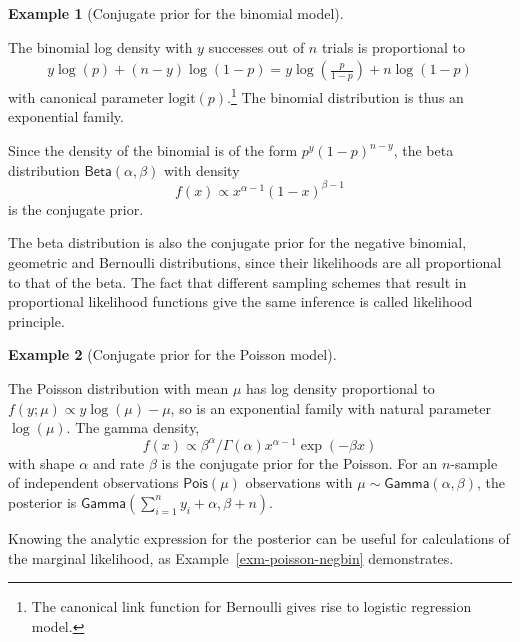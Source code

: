 \documentclass[
  11pt,
  letterpaper,
]{scrbook}
\theoremstyle{definition}
\newtheorem{example}{Example}[chapter]
\theoremstyle{definition}
\theoremstyle{definition}
\theoremstyle{plain}
\theoremstyle{remark}
\begin{document}
\begin{example}[Conjugate prior for the binomial
model]\protect\hypertarget{exm-conjugatepriors-binom}{}\label{exm-conjugatepriors-binom}

The binomial log density with \(y\) successes out of \(n\) trials is
proportional to \begin{align*}
y \log(p) + (n-y) \log(1-p) = y\log\left( \frac{p}{1-p}\right) + n \log(1-p)
\end{align*} with canonical parameter \(\mathrm{logit}(p)\).\footnote{The
  canonical link function for Bernoulli gives rise to logistic
  regression model.} The binomial distribution is thus an exponential
family.

Since the density of the binomial is of the form \(p^y(1-p)^{n-y}\), the
beta distribution \(\mathsf{Beta}(\alpha, \beta)\) with density
\[f(x) \propto x^{\alpha-1} (1-x)^{\beta-1}\] is the conjugate prior.

The beta distribution is also the conjugate prior for the negative
binomial, geometric and Bernoulli distributions, since their likelihoods
are all proportional to that of the beta. The fact that different
sampling schemes that result in proportional likelihood functions give
the same inference is called likelihood principle.

\end{example}

\begin{example}[Conjugate prior for the Poisson
model]\protect\hypertarget{exm-conjugatepriors-poisson}{}\label{exm-conjugatepriors-poisson}

The Poisson distribution with mean \(\mu\) has log density proportional
to \(f(y; \mu) \propto y\log(\mu) -\mu\), so is an exponential family
with natural parameter \(\log(\mu)\). The gamma density,
\[ f(x) \propto \beta^{\alpha}/\Gamma(\alpha)x^{\alpha-1} \exp(-\beta x)\]
with shape \(\alpha\) and rate \(\beta\) is the conjugate prior for the
Poisson. For an \(n\)-sample of independent observations
\(\mathsf{Pois}(\mu)\) observations with
\(\mu \sim \mathsf{Gamma}(\alpha, \beta)\), the posterior is
\(\mathsf{Gamma}(\sum_{i=1}^n y_i + \alpha, \beta + n)\).

\end{example}

Knowing the analytic expression for the posterior can be useful for
calculations of the marginal likelihood, as
Example~\ref{exm-poisson-negbin} demonstrates.
\end{document}
